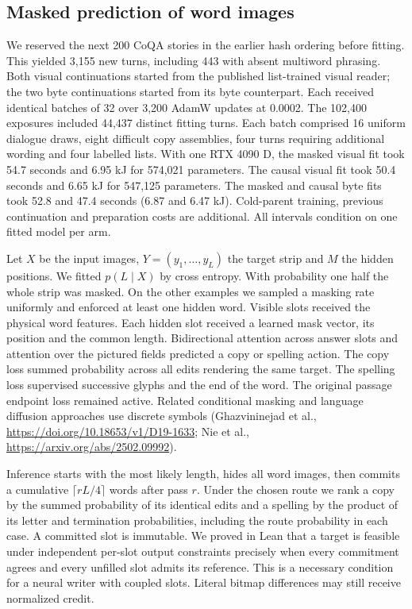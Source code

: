 \subsection*{Masked prediction of word images}
We reserved the next 200 CoQA stories in the earlier hash ordering before fitting. This yielded 3,155 new turns, including 443 with absent multiword phrasing. Both visual continuations started from the published list-trained visual reader; the two byte continuations started from its byte counterpart. Each received identical batches of 32 over 3,200 AdamW updates at 0.0002. The 102,400 exposures included 44,437 distinct fitting turns. Each batch comprised 16 uniform dialogue draws, eight difficult copy assemblies, four turns requiring additional wording and four labelled lists. With one RTX 4090 D, the masked visual fit took 54.7 seconds and 6.95 kJ for 574,021 parameters. The causal visual fit took 50.4 seconds and 6.65 kJ for 547,125 parameters. The masked and causal byte fits took 52.8 and 47.4 seconds (6.87 and 6.47 kJ). Cold-parent training, previous continuation and preparation costs are additional. All intervals condition on one fitted model per arm.

Let $X$ be the input images, $Y=(y_1,\ldots,y_L)$ the target strip and $M$ the hidden positions. We fitted $p(L\mid X)$ by cross entropy. With probability one half the whole strip was masked. On the other examples we sampled a masking rate uniformly and enforced at least one hidden word. Visible slots received the physical word features. Each hidden slot received a learned mask vector, its position and the common length. Bidirectional attention across answer slots and attention over the pictured fields predicted a copy or spelling action. The copy loss summed probability across all edits rendering the same target. The spelling loss supervised successive glyphs and the end of the word. The original passage endpoint loss remained active. Related conditional masking and language diffusion approaches use discrete symbols (Ghazvininejad et al., \url{https://doi.org/10.18653/v1/D19-1633}; Nie et al., \url{https://arxiv.org/abs/2502.09992}).

Inference starts with the most likely length, hides all word images, then commits a cumulative $\lceil rL/4\rceil$ words after pass $r$. Under the chosen route we rank a copy by the summed probability of its identical edits and a spelling by the product of its letter and termination probabilities, including the route probability in each case. A committed slot is immutable. We proved in Lean that a target is feasible under independent per-slot output constraints precisely when every commitment agrees and every unfilled slot admits its reference. This is a necessary condition for a neural writer with coupled slots. Literal bitmap differences may still receive normalized credit.


